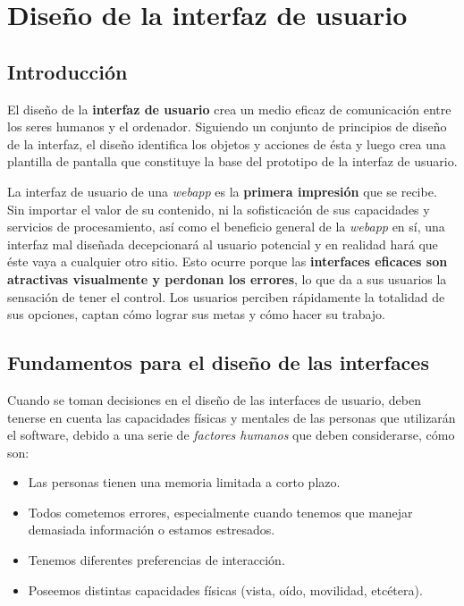 
	\section{Diseño de la interfaz de usuario} %
	\label{sec:interfaz_usuario}
	
	\subsection{Introducción} %
		\label{sub:iu_introduccion}
	
	El diseño de la \textbf{interfaz de usuario} crea un medio eficaz de comunicación entre los seres humanos y el ordenador. Siguiendo un conjunto de principios de diseño de la interfaz, el diseño identifica los objetos y acciones de ésta y luego crea una plantilla de pantalla que constituye la base del prototipo de la interfaz de usuario.
	
	La interfaz de usuario de una \textit{webapp} es la \textbf{primera impresión} que se recibe. Sin importar el valor de su contenido, ni la sofisticación de sus capacidades y servicios de procesamiento, así como el beneficio general de la \textit{webapp} en sí, una interfaz mal diseñada decepcionará al usuario potencial y en realidad hará que éste vaya a cualquier otro sitio. Esto ocurre porque las \textbf{interfaces eficaces son atractivas visualmente y perdonan los errores}, lo que da a sus usuarios la sensación de tener el control. Los usuarios perciben rápidamente la totalidad de sus opciones, captan cómo lograr sus metas y cómo hacer su trabajo.
	
	
	\subsection{Fundamentos para el diseño de las interfaces} %
	\label{sub:iu_fundamentos}
	
	Cuando se toman decisiones en el diseño de las interfaces de usuario, deben tenerse en cuenta las capacidades físicas y mentales de las personas que utilizarán el software, debido a una serie de \textit{factores humanos} que deben considerarse, cómo son:
	\begin{itemize}
		\item Las personas tienen una memoria limitada a corto plazo.
		\item Todos cometemos errores, especialmente cuando tenemos que manejar demasiada información o estamos estresados.
		\item Tenemos diferentes preferencias de interacción.
		\item Poseemos distintas capacidades físicas (vista, oído, movilidad, etcétera).
	\end{itemize}
